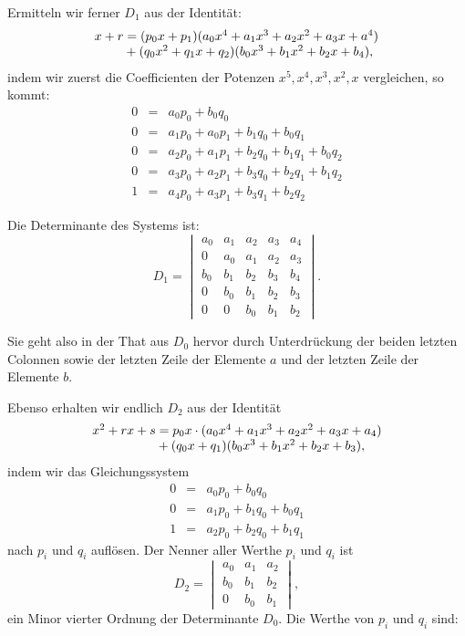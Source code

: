 \documentclass[11pt]{article}
\providecommand{\weq}[2]{\begin{equation}\tag{#1}#2\end{equation}}
\begin{document}
Ermitteln wir ferner $D_1$ aus der Identität:
\[
\begin{array}{l}
x+r = (p_0x+p_1)(a_0x^4+a_1x^3+a_2x^2+a_3x+a^4) %
\\
\hphantom{x+r} + (q_0x^2+q_1x+q_2)(b_0x^3+b_1x^2+b_2x+b_4), %
\end{array}
\]
indem wir zuerst die Coefficienten der Potenzen $x^5, x^4, x^3, x^2, x$ vergleichen, so kommt:
\weq{1}{
\begin{array}{rcl}
0 &=& a_0p_0 + b_0q_0 \\
0 &=& a_1p_0+a_0p_1 + b_1q_0+b_0q_1 \\
0 &=& a_2p_0+a_1p_1 + b_2q_0+b_1q_1+b_0q_2 \\
0 &=& a_3p_0+a_2p_1 + b_3q_0+b_2q_1+b_1q_2 \\
1 &=& a_4p_0+a_3p_1 + b_3q_1+b_2q_2
\end{array}}

Die Determinante des Systems ist:
\[
D_1 =
\begin{vmatrix}
a_0 & a_1 & a_2 & a_3 & a_4 \\
0 & a_0 & a_1 & a_2 & a_3 \\
b_0 & b_1 & b_2 & b_3 & b_4 \\
0 & b_0 & b_1 & b_2 & b_3 \\
0 & 0 & b_0 & b_1 & b_2
\end{vmatrix}.
\]

Sie geht also in der That aus $D_0$ hervor durch Unterdrückung der beiden letzten Colonnen sowie der letzten Zeile der Elemente $a$ und der letzten Zeile der Elemente $b$.

Ebenso erhalten wir endlich $D_2$ aus der Identität
\[
\begin{array}{l}
x^2+rx+s = p_0x\cdot(a_0x^4+a_1x^3+a_2x^2+a_3x+a_4) \\
\hphantom{x^2+rx+s} + (q_0x+q_1)(b_0x^3+b_1x^2+b_2x+b_3),
\end{array}
\]
indem wir das Gleichungssystem
\weq{1}{
\begin{array}{rcl}
0 &=& a_0p_0+b_0q_0 \\
0 &=& a_1p_0+b_1q_0+b_0q_1 \\
1 &=& a_2p_0+b_2q_0+b_1q_1
\end{array}}
nach $p_i$ und $q_i$ auflösen. Der Nenner aller Werthe $p_i$ und $q_i$ ist
\[
D_2 =
\begin{vmatrix}
a_0 & a_1 & a_2 \\
b_0 & b_1 & b_2 \\
0 & b_0 & b_1
\end{vmatrix},
\]
ein Minor vierter Ordnung der Determinante $D_0$. Die Werthe von $p_i$ und $q_i$ sind:
\end{document}
